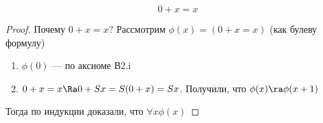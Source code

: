 \begin{proposition}
    \[0 + x = x\]
\end{proposition}
\begin{proof}
    Почему \(0 + x = x\)? Рассмотрим \(\phi(x) = (0 + x = x)\) (как булеву формулу)
    \begin{enumerate}
        \item \(\phi(0)\) --- по аксиоме В2.i
        \item \(0 + x = x \Ra 0 + Sx = S(0 + x) = Sx\). Получили, что \(\phi(x) \ra \phi(x + 1)\)
    \end{enumerate}
    Тогда по индукции доказали, что \(\forall x \phi(x)\)
\end{proof}
